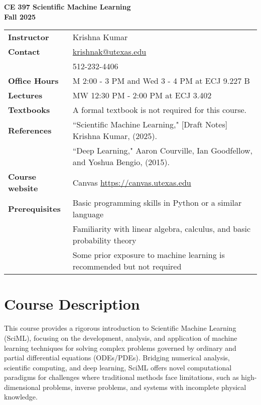 \documentclass[11pt,fourier]{article}
\begin{document}
\begin{center}
    \Large\textbf{CE 397 Scientific Machine Learning}\\
    \large\textbf{Fall 2025}
\end{center}

\vspace{1em}
\begin{tabularx}{\textwidth}{@{}p{2.5cm}X@{}}
\toprule
\textbf{Instructor} & Krishna Kumar \\
\textbf{Contact} & \href{mailto:krishnak@utexas.edu}{krishnak@utexas.edu} \\
 & 512-232-4406 \\
\midrule
\textbf{Office Hours} & M 2:00 - 3 PM and Wed 3 - 4 PM at ECJ 9.227 B \\
\textbf{Lectures} & MW 12:30 PM - 2:00 PM at ECJ 3.402 \\
\textbf{Textbooks} & A formal textbook is not required for this course. \\
\textbf{References} & ``Scientific Machine Learning," [Draft Notes] Krishna Kumar, (2025). \\
& ``Deep Learning," Aaron Courville, Ian Goodfellow, and Yoshua Bengio, (2015). \\
\textbf{Course website} & Canvas \href{https://canvas.utexas.edu}{https://canvas.utexas.edu} \\
\textbf{Prerequisites} & Basic programming skills in Python or a similar language\\
 & Familiarity with linear algebra, calculus, and basic probability theory\\
 & Some prior exposure to machine learning is recommended but not required\\
\bottomrule
\end{tabularx}

\section*{Course Description}
This course provides a rigorous introduction to Scientific Machine Learning (SciML), focusing on the development, analysis, and application of machine learning techniques for solving complex problems governed by ordinary and partial differential equations (ODEs/PDEs). Bridging numerical analysis, scientific computing, and deep learning, SciML offers novel computational paradigms for challenges where traditional methods face limitations, such as high-dimensional problems, inverse problems, and systems with incomplete physical knowledge.
\end{document}

